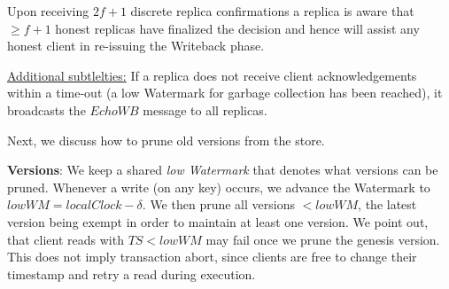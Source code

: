 Upon receiving $2f+1$ discrete replica confirmations a replica is aware that $\geq f+1$ honest replicas have finalized the decision and hence will assist any honest client in re-issuing the Writeback phase.

\underline{Additional subtlelties:} If a replica does not receive client acknowledgements within a time-out (a low Watermark for garbage collection has been reached), it broadcasts the $EchoWB$ message to all replicas. 


Next, we discuss how to prune old versions from the store.



\textbf{Versions}: We keep a shared \textit{low Watermark} that denotes what versions can be pruned. Whenever  a write (on any key) occurs, we advance the Watermark to $lowWM = localClock - \delta$. We then prune all versions $< lowWM$, the latest version being exempt in order to maintain at least one version.  We point out, that client reads with $TS < lowWM$ may fail once we prune the genesis version. This does not imply transaction abort, since clients are free to change their timestamp and retry a read during execution.

